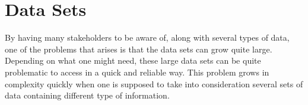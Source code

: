 \section{Data Sets} %
\label{sec:intro_data_sets}
By having many stakeholders to be aware of, along with several types of data,
one of the problems that arises is that the data sets can grow 
quite large. Depending on what one might need, these large data sets can be 
quite problematic to access in a quick and reliable way. This problem grows in 
complexity quickly when one is supposed to take into consideration several 
sets of data containing different type of information. 

